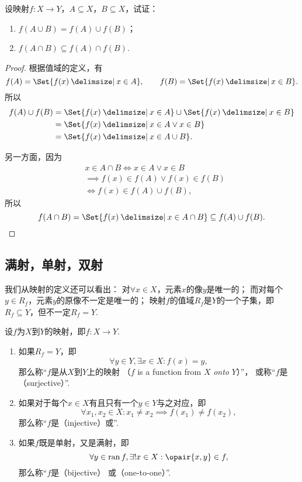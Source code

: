 \begin{example}
设映射\(f\colon X \to Y\)，\(A \subseteq X\)，\(B \subseteq X\)，试证：\begin{enumerate}
	\item \(f(A \cup B) = f(A) \cup f(B)\)；
	\item \(f(A \cap B) \subseteq f(A) \cap f(B)\).
\end{enumerate}
\begin{proof}
\def\fran#1{ \Set{ f(x) \given #1 } }
根据值域的定义，有\[
	f(A) = \fran{x \in A},
	\qquad
	f(B) = \fran{x \in B}.
\]所以\[
	\begin{split}
		f(A) \cup f(B)
		&= \fran{x \in A} \cup \fran{x \in B} \\
		&= \fran{x \in A \lor x \in B} \\
		&= \fran{x \in A \cup B}.
	\end{split}
\]

另一方面，因为\[
	\begin{split}
		&x \in A \cap B
		\iff
		x \in A \lor x \in B \\
		&\implies
		f(x) \in f(A) \lor f(x) \in f(B) \\
		&\iff
		f(x) \in f(A) \cup f(B),
	\end{split}
\]所以\[
	f(A \cap B) = \fran{x \in A \cap B}
	\subseteq f(A) \cup f(B).
	\qedhere
\]
\end{proof}
\end{example}

\subsection{满射，单射，双射}
我们从映射的定义还可以看出：
对\(\forall x \in X\)，元素\(x\)的像\(y\)是唯一的；
而对每个\(y \in R_f\)，元素\(y\)的原像不一定是唯一的；
映射\(f\)的值域\(R_f\)是\(Y\)的一个子集，即\(R_f \subseteq Y\)，但不一定\(R_f = Y\).

\begin{definition}
	设\(f\)为\(X\)到\(Y\)的映射，即\(f\colon X \to Y\).
	\begin{enumerate}
		\item 如果\(R_f = Y\)，即\[
			\forall y \in Y, \exists x \in X:
			f(x) = y,
		\]
		那么称“\(f\)是从\(X\)到\(Y\)上的映射%
		（\(f\) is a function from \(X\) \emph{onto} \(Y\)）”，
		或称“\(f\)是（surjective）”.

		\item 如果对于每个\(x \in X\)有且只有一个\(y \in Y\)与之对应，即\[
			\forall x_1, x_2 \in X:
			x_1 \neq x_2
			\implies
			f(x_1) \neq f(x_2),
		\]
		那么称“\(f\)是（injective）或”.

		\item 如果\(f\)既是单射，又是满射，即\[
			\forall y \in \ran f,
			\exists! x \in X:
			\opair{x,y} \in f,
		\]
		那么称“\(f\)是（bijective）%
		或（one-to-one）”.
	\end{enumerate}
\end{definition}

